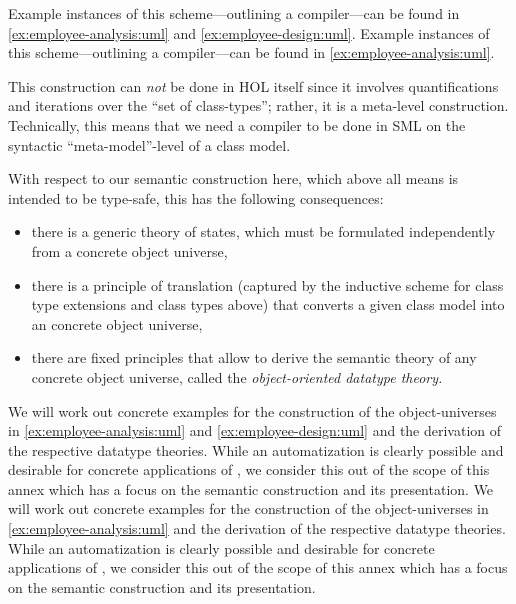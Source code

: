 \isatagafp
Example instances of this scheme---outlining a compiler---can be found
in \autoref{ex:employee-analysis:uml} and \autoref{ex:employee-design:uml}.
\endisatagafp
\isatagannexa
Example instances of this scheme---outlining a compiler---can be found
in \autoref{ex:employee-analysis:uml}.
\endisatagannexa

This construction can \emph{not} be done in HOL itself since it
involves quantifications and iterations over the ``set of class-types'';
rather, it is a meta-level construction.  Technically, this means that
we need a compiler to be done in SML on the syntactic
``meta-model''-level of a class model.

With respect to our semantic construction here,
which above all means is intended to be type-safe, this has the following consequences:
\begin{itemize}
\item there is a generic theory of states, which must be formulated independently
      from a concrete object universe,
\item there is a principle of translation (captured by the inductive scheme for
      class type extensions and class types above) that converts a given class model
      into an concrete object universe,
\item there are fixed principles that allow to derive the semantic theory of any
      concrete object universe, called the \emph{object-oriented datatype theory.}
\end{itemize}
\isatagafp
We will work out concrete examples for the construction of the
object-universes in \autoref{ex:employee-analysis:uml} and \autoref{ex:employee-design:uml} and the
derivation of the respective datatype theories. While an
automatization is clearly possible and desirable for concrete
applications of  \FOCL, we consider this out of the scope
of this annex which has a focus on the semantic construction and its
presentation.
\endisatagafp
\isatagannexa
We will work out concrete examples for the construction of the
object-universes in \autoref{ex:employee-analysis:uml} and the
derivation of the respective datatype theories. While an
automatization is clearly possible and desirable for concrete
applications of  \FOCL, we consider this out of the scope
of this annex which has a focus on the semantic construction and its
presentation.
\endisatagannexa


